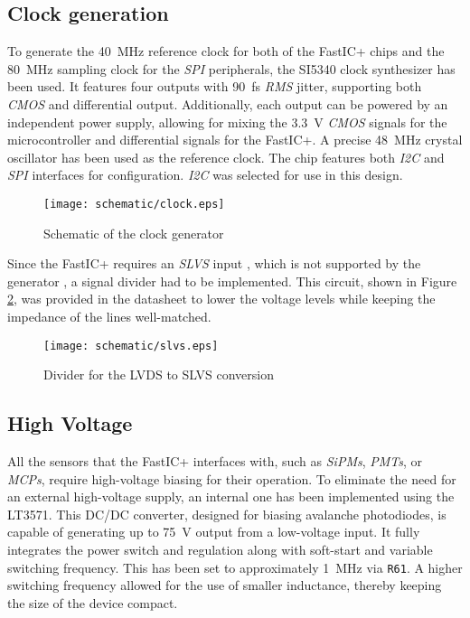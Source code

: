 \subsection{Clock generation}
To generate the \SI{40}{\mega\hertz} reference clock for both of the FastIC+ chips and the \SI{80}{\mega\hertz} sampling clock for the \emph{SPI} peripherals, the SI5340 clock synthesizer has been used. It features four outputs with \SI{90}{\femto\second} \emph{RMS} jitter, supporting both \emph{CMOS} and differential output. Additionally, each output can be powered by an independent power supply, allowing for mixing the \SI{3.3}{\volt} \emph{CMOS} signals for the microcontroller and differential signals for the FastIC+. A precise \SI{48}{\mega\hertz} crystal oscillator has been used as the reference clock. The chip features both \emph{I2C} and \emph{SPI} interfaces for configuration. \cite{si5340_datasheet} \emph{I2C} was selected for use in this design.

\FloatBarrier
\begin{figure}[htp!]
    \centering
    \texttt{[image: schematic/clock.eps]}
    \caption{Schematic of the clock generator}
    \label{fig:schem_clock}
\end{figure}
\FloatBarrier

Since the FastIC+ requires an \emph{SLVS} input \cite{ficDatasheet}, which is not supported by the generator \cite{si5340_datasheet}, a signal divider had to be implemented. This circuit, shown in Figure \ref{fig:schem_slvs}, was provided in the datasheet to lower the voltage levels while keeping the impedance of the lines well-matched. \cite{ficDatasheet}
\FloatBarrier
\begin{figure}[htp!]
    \centering
    \texttt{[image: schematic/slvs.eps]}
    \caption{Divider for the LVDS to SLVS conversion}
    \label{fig:schem_slvs}
\end{figure}
\FloatBarrier

\subsection{High Voltage}
All the sensors that the FastIC+ interfaces with, such as \emph{SiPMs}, \emph{PMTs}, or \emph{MCPs}, require high-voltage biasing for their operation. \cite{ficDatasheet} To eliminate the need for an external high-voltage supply, an internal one has been implemented using the LT3571. This DC/DC converter, designed for biasing avalanche photodiodes, is capable of generating up to \SI{75}{\volt} output from a low-voltage input. It fully integrates the power switch and regulation along with soft-start and variable switching frequency. This has been set to approximately \SI{1}{\mega\hertz} via \verb|R61|. A higher switching frequency allowed for the use of smaller inductance, thereby keeping the size of the device compact. \cite{lt3571_datasheet}

